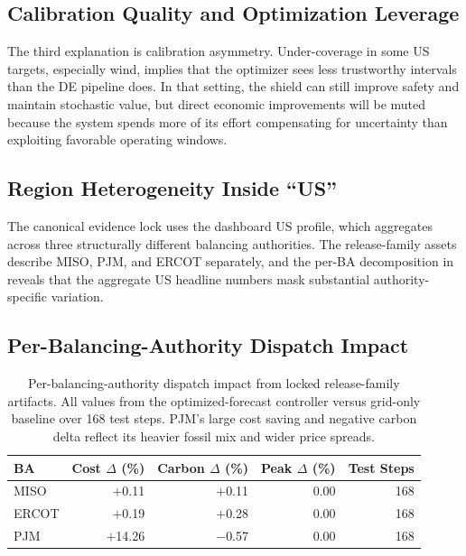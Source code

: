 \documentclass[11pt,a4paper]{article}
\begin{document}
\subsection{Calibration Quality and Optimization Leverage}

The third explanation is calibration asymmetry. Under-coverage in some US targets, especially wind, implies that the optimizer sees less trustworthy intervals than the DE pipeline does. In that setting, the shield can still improve safety and maintain stochastic value, but direct economic improvements will be muted because the system spends more of its effort compensating for uncertainty than exploiting favorable operating windows.

\subsection{Region Heterogeneity Inside ``US''}

The canonical evidence lock uses the dashboard US profile, which aggregates across three structurally different balancing authorities. The release-family assets describe MISO, PJM, and ERCOT separately, and the per-BA decomposition in  reveals that the aggregate US headline numbers mask substantial authority-specific variation.

\subsection{Per-Balancing-Authority Dispatch Impact}\label{sec:per_ba_impact}

\begin{table}[htbp]
\centering\small
\caption{Per-balancing-authority dispatch impact from locked release-family artifacts. All values from the optimized-forecast controller versus grid-only baseline over 168 test steps. PJM's large cost saving and negative carbon delta reflect its heavier fossil mix and wider price spreads.}
\label{tab:ba_impact}
\begin{tabular}{lrrrr}
\toprule
\textbf{BA} & \textbf{Cost $\Delta$ (\%)} & \textbf{Carbon $\Delta$ (\%)} & \textbf{Peak $\Delta$ (\%)} & \textbf{Test Steps} \\
\midrule
MISO  & $+$0.11 & $+$0.11 & 0.00 & 168 \\
ERCOT & $+$0.19 & $+$0.28 & 0.00 & 168 \\
PJM   & $+$14.26 & $-$0.57 & 0.00 & 168 \\
\bottomrule
\end{tabular}
\end{table}
\end{document}
